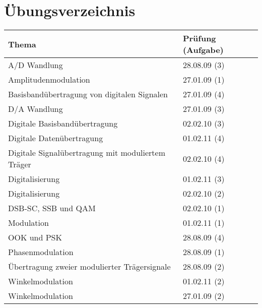 \section{Übungsverzeichnis}

\begin{tabular}{|l|l|}
	\hline
	\textbf{Thema} & \textbf{Prüfung (Aufgabe)}\\
	\hline
	A/D Wandlung & 28.08.09 (3)\\
	\hline
	Amplitudenmodulation & 27.01.09 (1) \\
	\hline
	Basisbandübertragung von digitalen Signalen & 27.01.09 (4)\\
	\hline
	D/A Wandlung & 27.01.09 (3)\\
	\hline
	Digitale Basisbandübertragung & 02.02.10 (3)\\
	\hline
	Digitale Datenübertragung & 01.02.11 (4)\\
	\hline
	Digitale Signalübertragung mit moduliertem Träger & 02.02.10 (4)\\
	\hline
	Digitalisierung & 01.02.11 (3)\\
	\hline
	Digitalisierung & 02.02.10 (2)\\
	\hline
	DSB-SC, SSB und QAM & 02.02.10 (1)\\
	\hline
	Modulation & 01.02.11 (1)\\
	\hline
	OOK und PSK & 28.08.09 (4)\\
	\hline
	Phasenmodulation & 28.08.09 (1)\\
	\hline
	Übertragung zweier modulierter Trägersignale & 28.08.09 (2)\\
	\hline
	Winkelmodulation & 01.02.11 (2)\\
	\hline
	Winkelmodulation & 27.01.09 (2)\\
	\hline
\end{tabular}